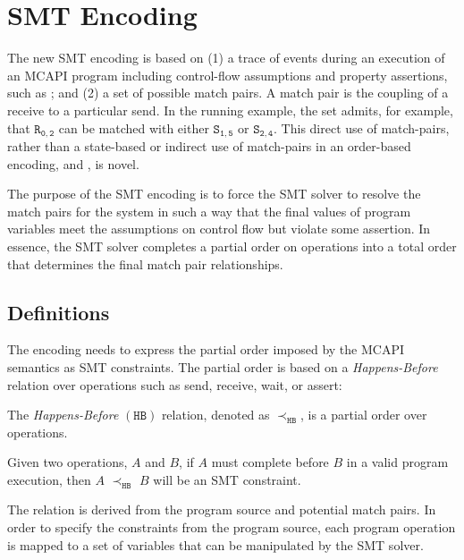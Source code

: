 \section{SMT Encoding}\label{sec:smt}

The new SMT encoding is based on (1) a trace of events during an
execution of an MCAPI program including control-flow assumptions and
property assertions, such as ; and (2) a set of
possible match pairs. A match pair is the coupling of a receive to a
particular send.  In the running example, the set admits, for example,
that $\mathtt{R_{0,2}}$ can be matched with either $\mathtt{S_{1,5}}$
or $\mathtt{S_{2,4}}$. This direct use of match-pairs, rather than a
state-based or indirect use of match-pairs in an order-based
encoding, \cite{elwakil:padtad10} and \cite{elwakil:atva10}, is novel.

The purpose of the SMT encoding is to force the SMT solver to resolve
the match pairs for the system in such a way that the final values of
program variables meet the assumptions on control flow but violate
some assertion. In essence, the SMT solver completes a partial order
on operations into a total order that determines the final match pair
relationships.

\subsection{Definitions} \label{sec:smt-defns}

The encoding needs to express the partial order imposed by the MCAPI
semantics as SMT constraints. The partial order is based on a
\emph{Happens-Before} relation over operations such as send, receive,
wait, or assert:

\begin{definition}
The \emph{Happens-Before} $(\mathtt{HB})$ relation, denoted as
$\mathrm{\prec_\mathtt{HB}}$, is a partial order over operations.
\label{def:hb}
\end{definition}

Given two operations, $A$ and $B$, if $A$ must complete before $B$ in a
valid program execution, then $A$ $\mathrm{\prec_{\mathtt{HB}}}$ $B$
will be an SMT constraint.

The relation is derived from the program source and potential match pairs. In
order to specify the constraints from the program source, each program operation is mapped to a set of variables that can be manipulated by the SMT solver.

